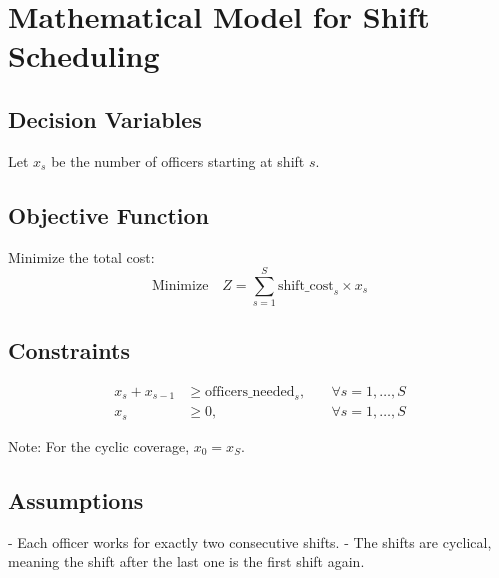 \documentclass{article}
\begin{document}
\section*{Mathematical Model for Shift Scheduling}

\subsection*{Decision Variables}
Let \( x_s \) be the number of officers starting at shift \( s \).

\subsection*{Objective Function}
Minimize the total cost:
\[
\text{Minimize} \quad Z = \sum_{s=1}^{S} \text{shift\_cost}_{s} \times x_s
\]

\subsection*{Constraints}
\begin{align*}
x_s + x_{s-1} &\geq \text{officers\_needed}_s, \quad &\forall s = 1, \ldots, S \\
x_{s} &\geq 0, \quad &\forall s = 1, \ldots, S
\end{align*}

\noindent Note: For the cyclic coverage, \( x_0 = x_S \).

\subsection*{Assumptions}
- Each officer works for exactly two consecutive shifts.
- The shifts are cyclical, meaning the shift after the last one is the first shift again.
\end{document}
